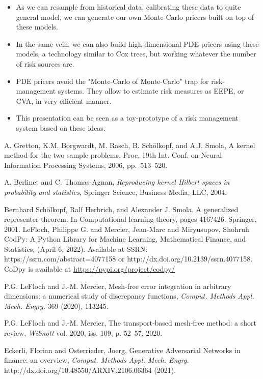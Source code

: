 \documentclass[]{article}
\numberwithin{equation}{section}
\begin{document}
\begin{itemize}

\item As we can resample from historical data, calibrating  these data to quite general model, we can generate our own Monte-Carlo pricers built on top of these models.


\item In the same vein, we can also build high dimensional PDE pricers using these models, a technology similar to Cox trees, but working whatever the number of risk sources are.

\item PDE pricers avoid the "Monte-Carlo of Monte-Carlo" trap for risk-management systems. They allow to estimate risk measures as EEPE, or CVA, in very efficient manner.

\item This presentation can be seen as a toy-prototype of a risk management system based on these ideas.

\end{itemize}

\begin{thebibliography}{00}

{\sc A. Gretton, K.M. Borgwardt, M. Rasch, B. Sch\"{o}lkopf, and A.J. Smola,}
A kernel method for the two sample problems,
Proc. 19th Int. Conf. on Neural Information Processing Systems, 2006, pp.~513--520.

{\sc A. Berlinet and C. Thomas-Agnan,}
{\it Reproducing kernel Hilbert spaces in probability and statistics,}
Springer Science, Business Media, LLC, 2004.

 Bernhard Sch\"{o}lkopf, Ralf Herbrich, and Alexander J. Smola. A generalized representer theorem. In Computational learning theory, pages 416?426. Springer, 2001.
{\sc LeFloch, Philippe G. and Mercier, Jean-Marc and Miryusupov, Shohruh}
CodPy: A Python Library for Machine Learning, Mathematical Finance, and Statistics,  (April 6, 2022). Available at SSRN: https://ssrn.com/abstract=4077158 or http://dx.doi.org/10.2139/ssrn.4077158. CoDpy is available at
\url{https://pypi.org/project/codpy/}


{\sc P.G. LeFloch and J.-M. Mercier,}
Mesh-free error integration in arbitrary dimensions: a numerical study of discrepancy functions,
{\it Comput. Methods Appl. Mech. Engrg.} 369 (2020), 113245.

{\sc P.G. LeFloch and J.-M. Mercier,}
The transport‐based mesh‐free method: a short review,
{\it Wilmott} vol. 2020, iss. 109, p. 52–57, 2020.


{\sc Eckerli, Florian and Osterrieder, Joerg,}
Generative Adversarial Networks in finance: an overview,
{\it Comput. Methods Appl. Mech. Engrg.} http://dx.doi.org/10.48550/ARXIV.2106.06364 (2021).

\end{thebibliography}
\end{document}
